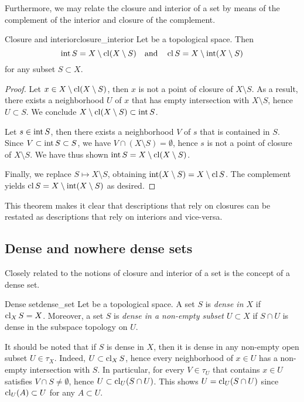 Furthermore, we may relate the closure and interior of a set by means of the complement of the interior and closure of the complement.
\begin{theorem}{Closure and interior}{closure_interior}
    Let  be a topological space. Then
    \begin{equation*}
        \operatorname{int} S = X \setminus \operatorname{cl}(X \setminus S)\quad\text{and}\quad \operatorname{cl}{S} = X \setminus \operatorname{int}(X \setminus S)
    \end{equation*}
    for any subset \(S \subset X\).
\end{theorem}
\begin{proof}
    Let \(x \in X\setminus\operatorname{cl}(X\setminus S)\), then \(x\) is not a point of closure of \(X \setminus S\). As a result, there exists a neighborhood \(U\) of \(x\) that has empty intersection with \(X \setminus S\), hence \(U \subset S\). We conclude \(X\setminus\operatorname{cl}(X \setminus S) \subset \operatorname{int} S\).

    Let \(s \in \operatorname{int} S\), then there exists a neighborhood \(V\) of \(s\) that is contained in \(S\). Since \(V \subset \operatorname{int} S \subset S\), we have \(V \cap (X \setminus S) = \emptyset\), hence \(s\) is not a point of closure of \(X \setminus S\). We have thus shown \(\operatorname{int} S = X \setminus \operatorname{cl}(X \setminus S)\).

    Finally, we replace \(S \mapsto X \setminus S\), obtaining \(\operatorname{int}(X\setminus S) = X \setminus \operatorname{cl} S\). The complement yields \(\operatorname{cl}{S} = X \setminus \operatorname{int}(X\setminus S)\) as desired.
\end{proof}
\begin{remark}
    This theorem makes it clear that descriptions that rely on closures can be restated as descriptions that rely on interiors and vice-versa.
\end{remark}

\subsection{Dense and nowhere dense sets}
Closely related to the notions of closure and interior of a set is the concept of a dense set.
\begin{definition}{Dense set}{dense_set}
    Let  be a topological space. A set \(S\) is \emph{dense in \(X\)} if \(\operatorname{cl}_X S = X\). Moreover, a set \(S\) is \emph{dense in a non-empty subset \(U \subset X\)} if \(S \cap U\) is dense in the subspace topology on \(U\).
\end{definition}
\begin{remark}
    It should be noted that if \(S\) is dense in \(X\), then it is dense in any non-empty open subset \(U \in \tau_X\). Indeed, \(U \subset \operatorname{cl}_X S\), hence every neighborhood of \(x \in U\) has a non-empty intersection with \(S\). In particular, for every \(V \in \tau_U\) that contains \(x \in U\) satisfies \(V \cap S \neq \emptyset\), hence \(U \subset \operatorname{cl}_U(S \cap U)\). This shows \(U = \operatorname{cl}_U(S\cap U)\) since \(\operatorname{cl}_U(A) \subset U\) for any \(A \subset U\).
\end{remark}


